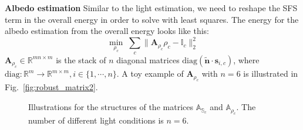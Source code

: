 \textbf{Albedo estimation}
Similar to the light estimation, we need to reshape the SFS term in the overall energy in order to solve with least squares.
The energy for the albedo estimation from the overall energy looks like this:
\begin{equation}\label{eq:robust_albedo_estimate}
	\min_{\rho_c} \; \sum_{c}\lVert \mathbf{A}_{\rho_c}\rho_c - \mathbb{I}_c \rVert^2_2 
\end{equation}
$ \mathbf{A}_{\rho_c} \in \mathbb{R}^{mn \times m}$ is the stack of $n$ diagonal matrices $\text{diag}(\tilde{\mathbf{n}} \cdot \mathbf{s}_{i,c})$, where $\text{diag} : \mathbb{R}^m \rightarrow \mathbb{R}^{m\times m}, i \in \{1, \cdots, n\}$.
A toy example of $\mathbf{A}_{\rho_c}$ with $n=6$ is illustrated in Fig.~\ref{fig:robust_matrix2}.

\begin{figure}[!htbp]
\centering
{}
\quad
{}

\caption{Illustrations for the structures of the matrices $\mathbb{A}_{\mathbb{S}_c}$ and $\mathbb{A}_{\rho_c}$. The number of different light conditions is $n = 6$.}
\label{fig:robust_matrix}
\end{figure}

